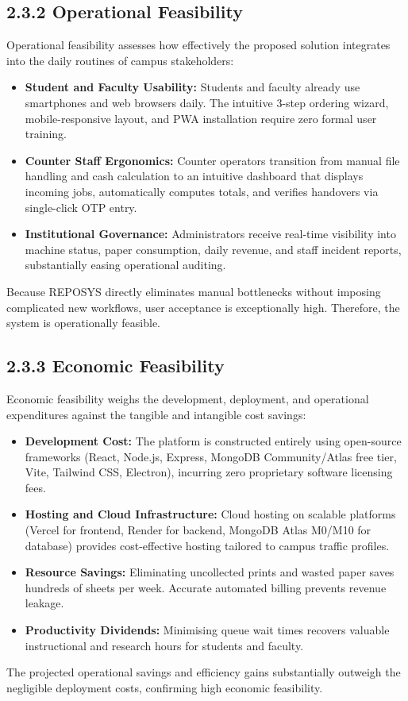 \documentclass[12pt,a4paper,oneside]{report}
\begin{document}
\subsection{2.3.2 Operational Feasibility}
Operational feasibility assesses how effectively the proposed solution integrates into the daily routines of campus stakeholders:
\begin{itemize}[leftmargin=0.35in, itemsep=2pt]
  \item \textbf{Student and Faculty Usability:} Students and faculty already use smartphones and web browsers daily. The intuitive 3-step ordering wizard, mobile-responsive layout, and PWA installation require zero formal user training.
  \item \textbf{Counter Staff Ergonomics:} Counter operators transition from manual file handling and cash calculation to an intuitive dashboard that displays incoming jobs, automatically computes totals, and verifies handovers via single-click OTP entry.
  \item \textbf{Institutional Governance:} Administrators receive real-time visibility into machine status, paper consumption, daily revenue, and staff incident reports, substantially easing operational auditing.
\end{itemize}
Because REPOSYS directly eliminates manual bottlenecks without imposing complicated new workflows, user acceptance is exceptionally high. Therefore, the system is operationally feasible.

\subsection{2.3.3 Economic Feasibility}
Economic feasibility weighs the development, deployment, and operational expenditures against the tangible and intangible cost savings:
\begin{itemize}[leftmargin=0.35in, itemsep=2pt]
  \item \textbf{Development Cost:} The platform is constructed entirely using open-source frameworks (React, Node.js, Express, MongoDB Community/Atlas free tier, Vite, Tailwind CSS, Electron), incurring zero proprietary software licensing fees.
  \item \textbf{Hosting and Cloud Infrastructure:} Cloud hosting on scalable platforms (Vercel for frontend, Render for backend, MongoDB Atlas M0/M10 for database) provides cost-effective hosting tailored to campus traffic profiles.
  \item \textbf{Resource Savings:} Eliminating uncollected prints and wasted paper saves hundreds of sheets per week. Accurate automated billing prevents revenue leakage.
  \item \textbf{Productivity Dividends:} Minimising queue wait times recovers valuable instructional and research hours for students and faculty.
\end{itemize}
The projected operational savings and efficiency gains substantially outweigh the negligible deployment costs, confirming high economic feasibility.
\end{document}
